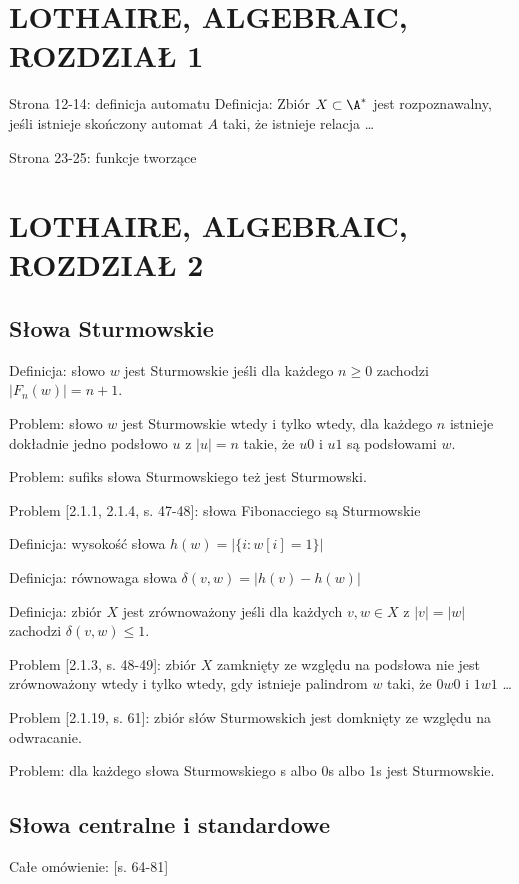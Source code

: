 \section{LOTHAIRE, ALGEBRAIC, ROZDZIAŁ 1}

Strona 12-14: definicja automatu
Definicja: Zbiór $X \subset \A^*$ jest rozpoznawalny, jeśli istnieje skończony automat $A$ taki, że istnieje relacja \ldots

Strona 23-25: funkcje tworzące

\section{LOTHAIRE, ALGEBRAIC, ROZDZIAŁ 2}

\subsection{Słowa Sturmowskie}

Definicja: słowo $w$ jest Sturmowskie jeśli dla każdego $n \ge 0$ zachodzi $|F_n(w)| = n + 1$.

Problem: słowo $w$ jest Sturmowskie wtedy i tylko wtedy, dla każdego $n$ istnieje dokładnie jedno podsłowo $u$ z $|u| = n$ takie, że $u0$ i $u1$ są podsłowami $w$.

Problem: sufiks słowa Sturmowskiego też jest Sturmowski.

Problem [2.1.1, 2.1.4, s. 47-48]: słowa Fibonacciego są Sturmowskie

Definicja: wysokość słowa $h(w) = |\{i: w[i] = 1\}|$

Definicja: równowaga słowa $\delta(v, w) = |h(v) - h(w)|$

Definicja: zbiór $X$ jest zrównoważony jeśli dla każdych $v, w \in X$ z $|v| = |w|$ zachodzi $\delta(v, w) \le 1$.

Problem [2.1.3, s. 48-49]: zbiór $X$ zamknięty ze względu na podsłowa nie jest zrównoważony wtedy i tylko wtedy, gdy istnieje palindrom $w$ taki, że $0w0$ i $1w1$ \ldots

Problem [2.1.19, s. 61]: zbiór słów Sturmowskich jest domknięty ze względu na odwracanie.

Problem: dla każdego słowa Sturmowskiego s albo 0s albo 1s jest Sturmowskie.

\subsection{Słowa centralne i standardowe}

Całe omówienie: [s. 64-81]

